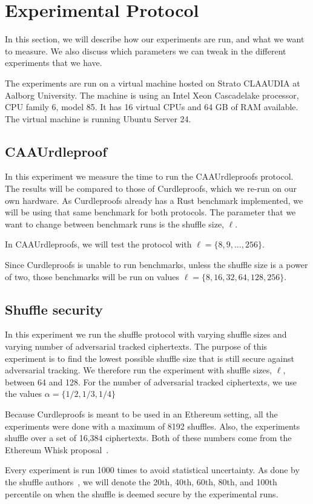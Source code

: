 
\section{Experimental Protocol}\label{sec:experimental-protocol}
In this section, we will describe how our experiments are run, and what we want to measure.
We also discuss which parameters we can tweak in the different experiments that we have.

The experiments are run on a virtual machine hosted on Strato CLAAUDIA at Aalborg University.
The machine is using an Intel Xeon Cascadelake processor, CPU family 6, model 85.
It has 16 virtual CPUs and 64 GB of RAM available.
The virtual machine is running Ubuntu Server 24.


\subsection{CAAUrdleproof}\label{sec:CAAUrdleproof-experiment}
In this experiment we measure the time to run the CAAUrdleproofs protocol.
The results will be compared to those of Curdleproofs, which we re-run on our own hardware.
As Curdleproofs already has a Rust benchmark implemented, we will be using that same benchmark for both protocols.
The parameter that we want to change between benchmark runs is the shuffle size, $\ell$.

In CAAUrdleproofs, we will test the protocol with $\ell=\{8,9,\dots,256\}$.

Since Curdleproofs is unable to run benchmarks, unless the shuffle size is a power of two, those benchmarks will be run on values $\ell=\{8,16,32,64,128,256\}$.




\subsection{Shuffle security}\label{subsec:experimental-protocol-shuffle-security}
In this experiment we run the shuffle protocol with varying shuffle sizes and varying number of adversarial tracked ciphertexts.
The purpose of this experiment is to find the lowest possible shuffle size that is still secure against adversarial tracking.
We therefore run the experiment with shuffle sizes, $\ell$, between 64 and 128.
For the number of adversarial tracked ciphertexts, we use the values $\alpha=\{1/2,1/3,1/4\}$

Because Curdleproofs is meant to be used in an Ethereum setting, all the experiments were done with a maximum of 8192 shuffles.
Also, the experiments shuffle over a set of 16,384 ciphertexts.
Both of these numbers come from the Ethereum Whisk proposal~\cite{Whisk2024}.


Every experiment is run 1000 times to avoid statistical uncertainty.
As done by the shuffle authors~\cite{cryptoeprint:2022/560}, we will denote the 20th, 40th, 60th, 80th, and 100th percentile on when the shuffle is deemed secure by the experimental runs.

